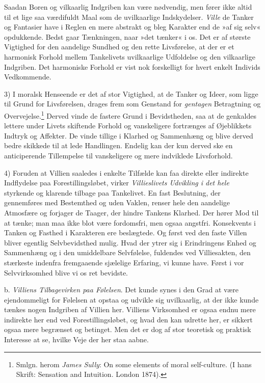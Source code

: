 \documentclass[12pt,a4paper,openany]{book}
\newcommand{\opage}[1]{\marginnote{\footnotesize\textit{[#1]}}}
\begin{document}
Saadan Boren og vilkaarlig Indgriben kan være nødvendig, men fører ikke
altid til et lige saa værdifuldt Maal som de uvilkaarlige Indskydelser.
\emph{Ville} de Tanker og Fantasier have i Reglen en mere abstrakt og
bleg Karakter end de »af sig selv« opdukkende. Bedst gaar Tænkningen,
naar »det tænker« i os. Det er af største Vigtighed for den aandelige
Sundhed og den rette Livsførelse, at der er et harmonisk Forhold mellem
Tankelivets uvilkaarlige Udfoldelse og den vilkaarlige Indgriben. Det
harmoniske Forhold er vist nok forskelligt for hvert enkelt Individs
Vedkommende.

3) I moralsk Henseende er det af stor Vigtighed, at de Tanker og Ideer,
som ligge til Grund for Livsførelsen, drages frem som Genstand for
\emph{gentagen} Betragtning og Overvejelse.\footnote[2]{Smlgn. herom \emph{James Sully}: On some elements of moral self-culture. (I hans Skrift:
Sensation and Intuition. London 1874).} Derved vinde de fastere Grund i
Bevidstheden, saa at de genkaldes lettere under Livets skiftende Forhold
og vanskeligere fortrænges af Øjeblikkets Indtryk og Affekter. De vinde
tillige i Klarhed og Sammenhæng og blive derved bedre skikkede til at
lede Handlingen. Endelig kan der kun derved ske en anticiperende
Tillempelse til vanskeligere og mere indviklede Livsforhold.


\opage{387}4) Foruden at Villien saaledes i enkelte Tilfælde kan faa
direkte eller indirekte Indflydelse paa Forestillingsløbet, virker
\emph{Villieslivets Udvikling i det hele} styrkende og klarende tilbage
paa Tankelivet. En fast Beslutning, der gennemføres med Bestemthed og
uden Vaklen, renser hele den aandelige Atmosfære og forjager de Taager,
der hindre Tankens Klarhed. Der hører Mod til at tænke; man maa ikke
blot være fordomsfri, men ogsaa angstfri. Konsekvents i Tanken og
Fasthed i Karakteren ere beslægtede. Og først ved den faste Villen
bliver egentlig Selvbevidsthed mulig. Hvad der ytrer sig i Erindringens
Enhed og Sammenhæng og i den umiddelbare Selvfølelse, fuldendes ved
Villiesakten, den stærkeste indenfra fremgaaende sjælelige Erfaring, vi
kunne have. Først i vor Selvvirksomhed blive vi os ret bevidste.

b. \emph{Villiens Tilbagevirken paa Følelsen}. Det kunde synes i den
Grad at være ejendommeligt for Følelsen at opstaa og udvikle sig
uvilkaarlig, at der ikke kunde tænkes nogen Indgriben af Villien her.
Villiens Virksomhed er ogsaa endnu mere indirekte her end ved
Forestillingsløbet, og hvad den kan udrette her, er sikkert ogsaa mere
begrænset og betinget. Men det er dog af stor teoretisk og praktisk
Interesse at se, hvilke Veje der her staa aabne.
\end{document}
